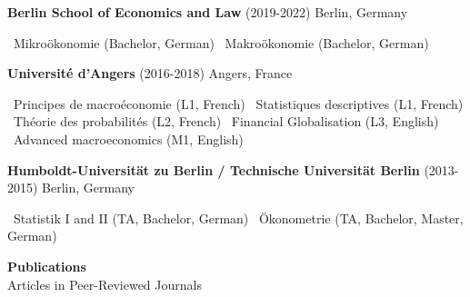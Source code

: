 \documentclass[11pt]{article}
\begin{document}
\textbf{Berlin School of Economics and Law} (2019-2022) \hfill Berlin, Germany

\vspace{7pt}

\textbullet \  Mikroökonomie (Bachelor, German)
    \textbullet \ Makroökonomie (Bachelor, German)

\vspace{14pt}

\textbf{Université d'Angers} (2016-2018) \hfill Angers, France

\vspace{7pt}

\textbullet \ Principes de macroéconomie (L1, French) \textbullet \ Statistiques descriptives (L1, French) \textbullet \ Théorie des probabilités (L2, French) \textbullet \ Financial Globalisation (L3, English) \textbullet \ Advanced macroeconomics (M1, English)

\vspace{14pt}

\textbf{Humboldt-Universität zu Berlin / Technische Universität Berlin} (2013-2015) \hfill Berlin, Germany

\vspace{7pt}

 \textbullet \ Statistik I and II (TA, Bachelor, German) 
    \textbullet \ Ökonometrie (TA, Bachelor, Master, German)

\vspace{20pt}

\begin{center}
    \textbf{Publications} \\
    \vspace{2pt}
    Articles in Peer-Reviewed Journals
\end{center}
\end{document}
